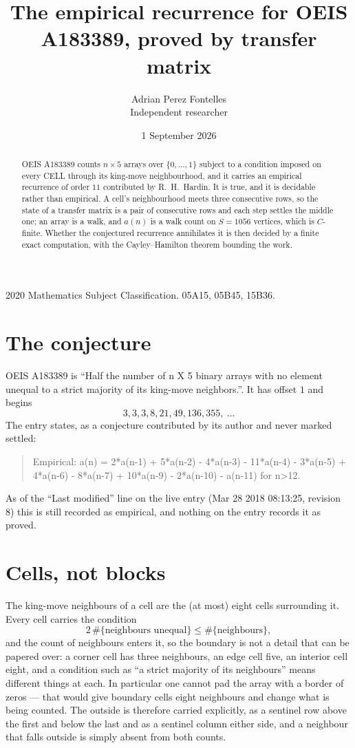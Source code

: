 \documentclass[11pt,a4paper]{article}
\title{The empirical recurrence for OEIS A183389, proved by transfer matrix}
\author{Adrian Perez Fontelles\\ \small Independent researcher}
\date{1 September 2026}
\theoremstyle{plain}
\theoremstyle{definition}
\begin{document}
\maketitle

\begin{abstract}
OEIS A183389 counts $n\times5$ arrays over $\{0,\dots,1\}$ subject to a condition imposed on
every CELL through its king-move neighbourhood, and it carries an empirical recurrence of
order $11$ contributed by R.~H.~Hardin. It is true, and it is decidable rather than
empirical. A cell's neighbourhood meets three consecutive rows, so the state of a transfer
matrix is a pair of consecutive rows and each step settles the middle one; an array is a
walk, and $a(n)$ is a walk count on $S=1056$ vertices, which is $C$-finite. Whether the
conjectured recurrence annihilates it is then decided by a finite exact computation, with the
Cayley--Hamilton theorem bounding the work.
\end{abstract}

\noindent\small 2020 Mathematics Subject Classification. 05A15, 05B45, 15B36.\normalsize

\section{The conjecture}

OEIS A183389 is ``Half the number of n X 5 binary arrays with no element unequal to a strict majority of its king-move neighbors.''. It has offset $1$ and begins
\[
3, 3, 3, 8, 21, 49, 136, 355,\ \dots
\]
The entry states, as a conjecture contributed by its author and never marked settled:
\begin{quote}
Empirical: a(n) = 2*a(n-1) + 5*a(n-2) - 4*a(n-3) - 11*a(n-4) - 3*a(n-5) + 4*a(n-6) - 8*a(n-7) + 10*a(n-9) - 2*a(n-10) - a(n-11) for n>12.
\end{quote}
As of the ``Last modified'' line on the live entry (Mar 28 2018 08:13:25, revision 8) this is still
recorded as empirical, and nothing on the entry records it as proved.

\section{Cells, not blocks}

The king-move neighbours of a cell are the (at most) eight cells surrounding it. Every cell
carries the condition
\[
2\,\#\{\text{neighbours unequal}\}\le\#\{\text{neighbours}\},
\]
and the count of neighbours enters it, so the boundary is not a detail that can be papered
over: a corner cell has three neighbours, an edge cell five, an interior cell eight, and a
condition such as ``a strict majority of its neighbours'' means different things at each. In
particular one cannot pad the array with a border of zeros --- that would give boundary cells
eight neighbours and change what is being counted. The outside is therefore carried
explicitly, as a sentinel row above the first and below the last and as a sentinel column
either side, and a neighbour that falls outside is simply absent from both counts.
\end{document}
